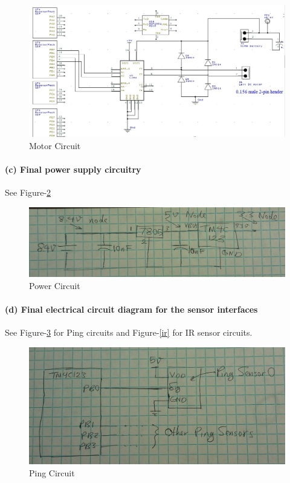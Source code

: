 \documentclass[a4paper]{article}
\newlength{\pic}
\begin{document}
\setlength{\pic}{\textwidth}
\begin{figure}[htp]
\center
\includegraphics[width=\pic]{circuits/PWM_Circuit}
\caption{Motor Circuit} \label{pwm}
\end{figure}


\paragraph{(c) Final power supply circuitry }
See Figure-\ref{pw}

\setlength{\pic}{12cm}
\begin{figure}[htp]
\center
\includegraphics[width=\pic]{circuits/Power_Circuit}
\caption{Power Circuit} \label{pw}
\end{figure}


\paragraph{(d) Final electrical circuit diagram for the sensor interfaces \\}
See Figure-\ref{ping} for Ping circuits and Figure-\ref{ir} for IR sensor circuits.

\setlength{\pic}{12cm}
\begin{figure}[htp]
\center
\includegraphics[width=\pic]{circuits/ping}
\caption{Ping Circuit} \label{ping}
\end{figure}
\end{document}
